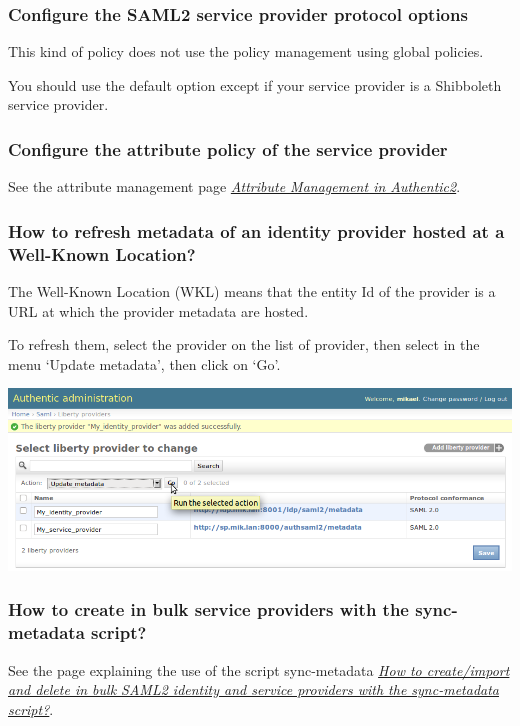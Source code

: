 \documentclass[letterpaper,10pt,english]{sphinxmanual}
\begin{document}
\subsubsection{Configure the SAML2 service provider protocol options}
\label{config_saml2_sp:configure-the-saml2-service-provider-protocol-options}
This kind of policy does not use the policy management using global policies.

You should use the default option except if your service provider is a
Shibboleth service provider.


\subsubsection{Configure the attribute policy of the service provider}
\label{config_saml2_sp:configure-the-attribute-policy-of-the-service-provider}
See the attribute management page {\hyperref[attribute_management:attribute-management]{\emph{Attribute Management in Authentic2}}}.


\subsubsection{How to refresh metadata of an identity provider hosted at a Well-Known Location?}
\label{config_saml2_sp:how-to-refresh-metadata-of-an-identity-provider-hosted-at-a-well-known-location}
The Well-Known Location (WKL) means that the entity Id of the provider is a
URL at which the provider metadata are hosted.

To refresh them, select the provider on the list of provider, then select in
the menu `Update metadata', then click on `Go'.

\includegraphics{update_metadata.png}


\subsubsection{How to create in bulk service providers with the sync-metadata script?}
\label{config_saml2_sp:how-to-create-in-bulk-service-providers-with-the-sync-metadata-script}
See the page explaining the use of the script sync-metadata {\hyperref[sync-metadata_script:sync-metadata-script]{\emph{How to create/import and delete in bulk SAML2 identity and service providers with the sync-metadata script?}}}.
\end{document}
